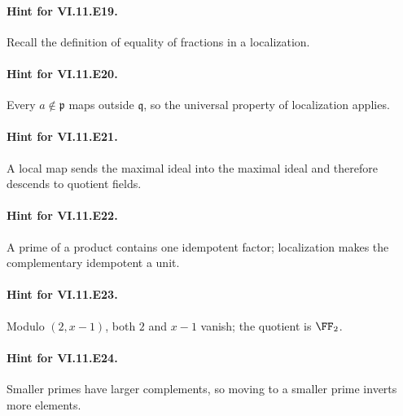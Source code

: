 \paragraph{Hint for VI.11.E19.} Recall the definition of equality of fractions in a localization.

\paragraph{Hint for VI.11.E20.} Every $a\notin\mathfrak p$ maps outside $\mathfrak q$, so the universal property of localization applies.

\paragraph{Hint for VI.11.E21.} A local map sends the maximal ideal into the maximal ideal and therefore descends to quotient fields.

\paragraph{Hint for VI.11.E22.} A prime of a product contains one idempotent factor; localization makes the complementary idempotent a unit.

\paragraph{Hint for VI.11.E23.} Modulo $(2,x-1)$, both $2$ and $x-1$ vanish; the quotient is $\FF_2$.

\paragraph{Hint for VI.11.E24.} Smaller primes have larger complements, so moving to a smaller prime inverts more elements.
